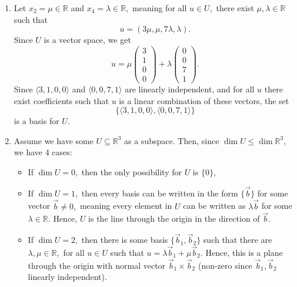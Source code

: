 \documentclass[12pt]{article}
\begin{document}
\begin{enumerate}
  \item Let $x_2 = \mu \in \mathbb R$ and $x_4 = \lambda \in \mathbb
    R,$ meaning for all $u \in U,$ there exist $\mu, \lambda \in
    \mathbb R$ such that
    $$
    u = (3\mu, \mu, 7\lambda, \lambda).
    $$
    Since $U$ is a vector space, we get
    $$
    u = \mu
    \begin{pmatrix}
      3 \\
      1 \\
      0 \\
      0
    \end{pmatrix} + \lambda
    \begin{pmatrix}
      0 \\
      0 \\
      7 \\
      1
    \end{pmatrix}.
    $$
    Since $\langle 3, 1, 0, 0 \rangle$ and $\langle 0, 0, 7,
    1\rangle$ are linearly independent, and for all $u$ there exist
    coefficients such that $u$ is a linear combination of these vectors, the set
    $$
    \{\langle 3, 1, 0, 0 \rangle, \langle 0, 0, 7, 1\rangle\}
    $$
    is a basis for $U.$

  \item Assume we have some $U \subseteq \mathbb R^3$ as a subspace.
    Then, since $\dim U \leq \dim \mathbb R^3,$ we have 4 cases:
    \begin{itemize}
      \item If $\dim U = 0,$ then the only possibility for $U$ is $\{0\},$

      \item If $\dim U = 1,$ then every basis can be written in the
        form $\{\vec b\}$ for some vector $\vec b \neq 0,$ meaning
        every element in $U$ can be written as $\lambda \vec b$ for
        some $\lambda \in \mathbb R.$ Hence, $U$ is the line through
        the origin in the direction of $\vec b.$

      \item If $\dim U = 2,$ then there is some basis $\{\vec b_1,
        \vec b_2\}$ such that there are $\lambda, \mu \in \mathbb R,$
        for all $u \in U$ such that $u = \lambda \vec b_1 + \mu \vec
        b_2.$ Hence, this is a plane through the origin with normal
        vector $\vec b_1 \times \vec b_2$ (non-zero since $\vec b_1,
        \vec b_2$ linearly independent).


\end{itemize}
\end{enumerate}
\end{document}
